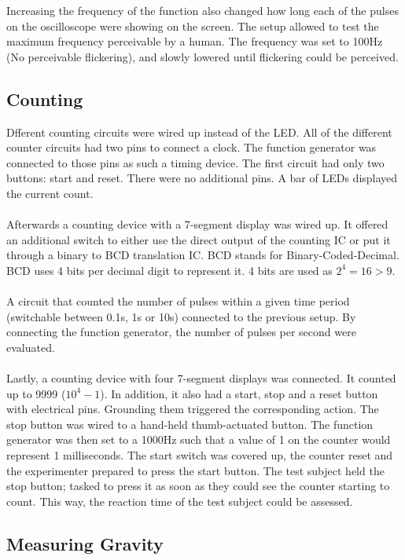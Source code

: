 \documentclass[fleqn,14pt]{article}
\begin{document}
Increasing the frequency of the function also changed how long each of the pulses on the oscilloscope 
were showing on the screen.
The setup allowed to test the maximum frequency perceivable by a human. The
frequency was set to 100Hz (No perceivable flickering), and slowly lowered until flickering could be perceived.

\subsection{Counting}
Dfferent counting circuits were wired up instead of the LED.
All of the different counter circuits had two pins to connect
a clock. The function generator was connected to those pins as such a timing device. The first circuit had
only two buttons: start and reset. There were no additional pins. A bar of LEDs displayed the current
count. \\
\\
Afterwards a counting device with a
7-segment display was wired up. It offered an additional switch to either use the direct output
of the counting IC or put it through a binary to BCD translation IC. BCD stands for  Binary-Coded-Decimal.
BCD uses 4 bits per decimal digit to represent it. 4 bits are used as $2^4=16 > 9$. \\
\\
A circuit that counted the number of pulses within a given time period (switchable between
0.1s, 1s or 10s) connected to the previous setup. By connecting the function generator,
the number of pulses per second were evaluated.\\
\\
Lastly, a counting device with four 7-segment displays was connected. It counted up to 9999 ($10^4-1$). In
addition, it also had a start, stop and a reset button with electrical pins. Grounding them triggered
the corresponding action. The stop button was wired to a hand-held thumb-actuated button. The function
generator was then set to a 1000Hz such that a value of 1 on the counter would represent 1 milliseconds.
The start switch was covered up, the counter reset and the experimenter prepared to press the start button.
The test subject held the stop button; tasked to press it as soon as they could see the counter
starting to count.
This way, the reaction time of the test subject could be assessed.

\subsection{Measuring Gravity}
\end{document}

